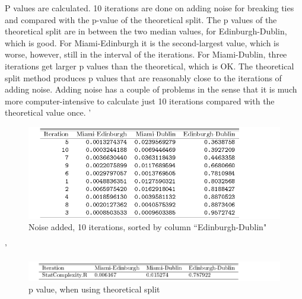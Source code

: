 P values are calculated. 10 iterations are done on adding noise for breaking ties and compared with the p-value of the theoretical split. The p values of the theoretical split are in between the two median values, for Edinburgh-Dublin, which is good. For Miami-Edinburgh it is the second-largest value, which is worse, however, still in the interval of the iterations. For Miami-Dublin, three iterations get larger p values than the theoretical, which is OK. The theoretical split method produces p values that are reasonably close to the iterations of adding noise. Adding noise has a couple of problems in the sense that it is much more computer-intensive to calculate just 10 iterations compared with the theoretical value once.
'\begin{figure}
    \centering
    \includegraphics[width=\textwidth,keepaspectratio]{../../Weather/pValuesTheoretical,10=Iterations,Sorted.pdf}
    \caption{Noise added, 10 iterations, sorted by column “Edinburgh-Dublin"}
\end{figure}

'\begin{figure}
    \centering
    \includegraphics[width=\textwidth,keepaspectratio]{../../Weather/pValuesTheoretical.pdf}
    \caption{p value, when using theoretical split}
\end{figure}

